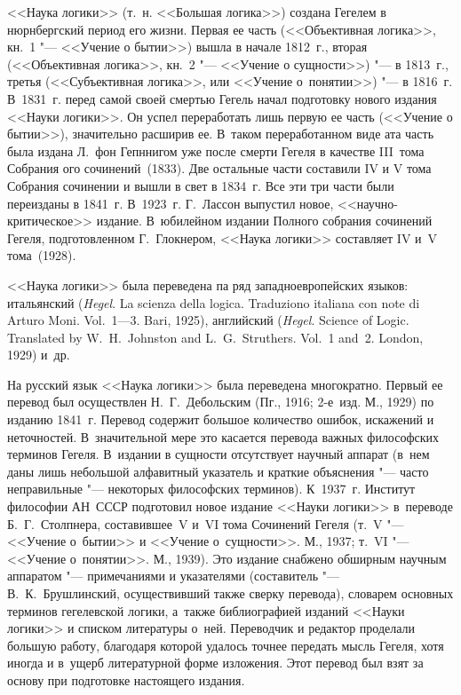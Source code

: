 <<Наука логики>> (т.~н. <<Большая логика>>) создана Гегелем в нюрнбергский
период его жизни. Первая ее часть (<<Объективная логика>>, кн.~1 "--- <<Учение
о бытии>>) вышла в начале 1812~г., вторая (<<Объективная логика>>, кн.~2 "---
<<Учение о сущности>>) "--- в 1813~г., третья (<<Субъективная логика>>, или
<<Учение о~понятии>>) "--- в 1816~г. В~1831~г. перед самой своей смертью Гегель
начал подготовку нового издания <<Науки логики>>. Он успел переработать лишь
первую ее часть (<<Учение о бытии>>), значительно расширив ее. В~таком
переработанном виде ата часть была издана Л.~фон Гепннигом уже после смерти
Гегеля в качестве III~тома Собрания ого сочинений~(1833). Две остальные части
составили IV и V тома Собрания сочинении и вышли в свет в 1834~г. Все эти три
части были переизданы в 1841~г. В~1923~г. Г.~Лассон выпустил новое,
<<научно-критическое>> издание. В~юбилейном издании Полного собрания сочинений
Гегеля, подготовленном Г.~Глокнером, <<Наука логики>>
составляет IV и~V тома~(1928).

<<Наука логики>> была переведена па ряд западноевропейских языков: итальянский
({\em Hegel}. La scienza della logica. Traduziono italiana con note di Arturo
Moni. Vol.~1---3. Bari, 1925), английский ({\em Hegel}. Science of Logic.
Translated by W.~H.~Johnston and L.~G.~Struthers. Vol.~1 and~2. London, 1929)
и~др.

На русский язык <<Наука логики>> была переведена многократно. Первый ее перевод
был осуществлен Н.~Г.~Дебольским (Пг., 1916; 2-е~изд. М., 1929) по изданию
1841~г. Перевод содержит большое количество ошибок, искажений и неточностей.
В~значительной мере это касается перевода важных философских терминов Гегеля.
В~издании в сущности отсутствует научный аппарат (в~нем даны лишь небольшой
алфавитный указатель и краткие объяснения "--- часто неправильные "---
некоторых философских терминов). К~1937~г. Институт философии АН~СССР
подготовил новое издание <<Науки логики>> в~переводе Б.~Г.~Столпнера,
составившее~V и~VI тома Сочинений Гегеля (т.~V "--- <<Учение о~бытии>> и
<<Учение о~сущности>>. М., 1937; т.~VI "--- <<Учение о~понятии>>. М., 1939).
Это издание снабжено обширным научным аппаратом "--- примечаниями и указателями
(составитель "--- В.~К.~Брушлинский, осуществивший также сверку перевода),
словарем основных терминов гегелевской логики, а~также библиографией изданий
<<Науки логики>> и списком литературы о~ней. Переводчик и редактор проделали
большую работу, благодаря которой удалось точнее передать мысль Гегеля, хотя
иногда и в~ущерб литературной форме изложения. Этот перевод был взят за основу
при подготовке настоящего издания.

\bigskip

\begin{center}
~~~~~~
\end{center}

\bigskip

\begin{footnotesize}
\printpagenotes
\end{footnotesize}
